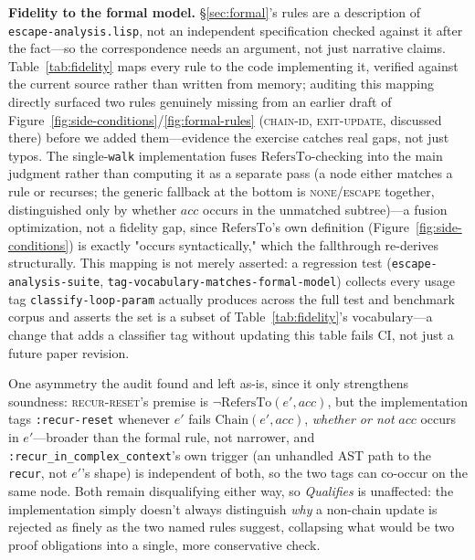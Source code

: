\documentclass[sigplan,review,anonymous]{acmart}
\begin{document}
\textbf{Fidelity to the formal model.} §\ref{sec:formal}'s rules are a description of \texttt{escape-analysis.lisp}, not an independent specification checked against it after the fact---so the correspondence needs an argument, not just narrative claims. Table~\ref{tab:fidelity} maps every rule to the code implementing it, verified against the current source rather than written from memory; auditing this mapping directly surfaced two rules genuinely missing from an earlier draft of Figure~\ref{fig:side-conditions}/\ref{fig:formal-rules} (\textsc{chain-id}, \textsc{exit-update}, discussed there) before we added them---evidence the exercise catches real gaps, not just typos. The single-\texttt{walk} implementation fuses $\mathrm{RefersTo}$-checking into the main judgment rather than computing it as a separate pass (a node either matches a rule or recurses; the generic fallback at the bottom is \textsc{none}/\textsc{escape} together, distinguished only by whether $acc$ occurs in the unmatched subtree)---a fusion optimization, not a fidelity gap, since $\mathrm{RefersTo}$'s own definition (Figure~\ref{fig:side-conditions}) is exactly "occurs syntactically," which the fallthrough re-derives structurally. This mapping is not merely asserted: a regression test (\texttt{escape-analysis-suite}, \texttt{tag-vocabulary-matches-formal-model}) collects every usage tag \texttt{classify-loop-param} actually produces across the full test and benchmark corpus and asserts the set is a subset of Table~\ref{tab:fidelity}'s vocabulary---a change that adds a classifier tag without updating this table fails CI, not just a future paper revision.

One asymmetry the audit found and left as-is, since it only strengthens soundness: \textsc{recur-reset}'s premise is $\neg\mathrm{RefersTo}(e',acc)$, but the implementation tags \texttt{:recur-reset} whenever $e'$ fails $\mathrm{Chain}(e',acc)$, \emph{whether or not} $acc$ occurs in $e'$---broader than the formal rule, not narrower, and \texttt{:recur\_in\_complex\_context}'s own trigger (an unhandled AST path to the \texttt{recur}, not $e'$'s shape) is independent of both, so the two tags can co-occur on the same node. Both remain disqualifying either way, so \emph{Qualifies} is unaffected: the implementation simply doesn't always distinguish \emph{why} a non-chain update is rejected as finely as the two named rules suggest, collapsing what would be two proof obligations into a single, more conservative check.
\end{document}
